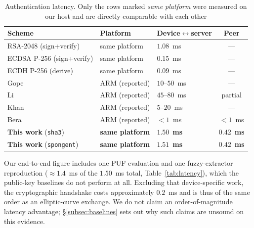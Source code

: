 \documentclass[11pt,a4paper]{article}
\begin{document}
\begin{table}[H]
\centering
\caption{Authentication latency. Only the rows marked \emph{same platform} were
measured on our host and are directly comparable with each other}
\label{tab:cmp_latency}
\small
\begin{tabular}{@{}p{3.5cm}p{3.0cm}p{2.6cm}c@{}}
\toprule
\textbf{Scheme} & \textbf{Platform} & \textbf{Device$\leftrightarrow$server} &
\textbf{Peer} \\
\midrule
RSA-2048 (sign+verify) & same platform & $1.08$~ms & --- \\
ECDSA P-256 (sign+verify) & same platform & $0.15$~ms & --- \\
ECDH P-256 (derive) & same platform & $0.09$~ms & --- \\
\midrule
Gope~\cite{puf_lightweight_uav} & ARM (reported) & $10$--$50$~ms & --- \\
Li~\cite{puf_uav_cross_domain} & ARM (reported) & $45$--$80$~ms & partial \\
Khan~\cite{puf_6g_uav} & ARM (reported) & $5$--$20$~ms & --- \\
Bera~\cite{peer2peer_auth} & ARM (reported) & $<1$~ms & $<1$~ms \\
\midrule
\textbf{This work} (\texttt{sha3}) & \textbf{same platform} &
$\mathbf{1.50}$~\textbf{ms} & $\mathbf{0.42}$~\textbf{ms} \\
\textbf{This work} (\texttt{spongent}) & \textbf{same platform} &
$\mathbf{1.51}$~\textbf{ms} & $\mathbf{0.42}$~\textbf{ms} \\
\bottomrule
\end{tabular}
\normalsize
\end{table}

Our end-to-end figure includes one PUF evaluation and one fuzzy-extractor
reproduction ($\approx 1.4$~ms of the $1.50$~ms total, Table~\ref{tab:latency}),
which the public-key baselines do not perform at all. Excluding that
device-specific work, the cryptographic handshake costs approximately $0.2$~ms and
is thus of the same order as an elliptic-curve exchange. We do not claim an
order-of-magnitude latency advantage; \S\ref{subsec:baselines} sets out why such
claims are unsound on this evidence.
\end{document}
